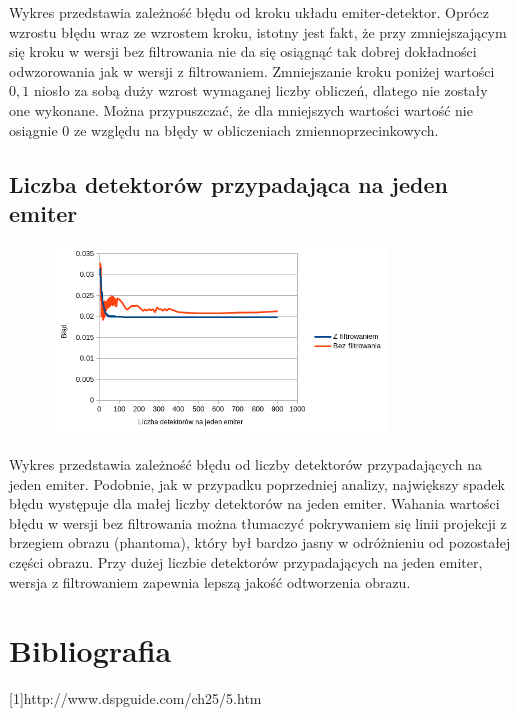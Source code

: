 \documentclass{article}
\begin{document}
Wykres przedstawia zależność błędu od kroku układu emiter-detektor. Oprócz wzrostu błędu wraz ze wzrostem kroku, istotny jest fakt, że przy zmniejszającym się kroku w wersji bez filtrowania nie da się osiągnąć tak dobrej dokładności odwzorowania jak w wersji z filtrowaniem. Zmniejszanie kroku poniżej wartości $0,1$ niosło za sobą duży wzrost wymaganej liczby obliczeń, dlatego nie zostały one wykonane. Można przypuszczać, że dla mniejszych wartości wartość nie osiągnie $0$ ze względu na błędy w obliczeniach zmiennoprzecinkowych. 

\subsection{Liczba detektorów przypadająca na jeden emiter}
\begin{figure}[H]
\begin{center}
\includegraphics[width=0.8\textwidth]{./detector_count.png}
\end{center}
\end{figure}

Wykres przedstawia zależność błędu od liczby detektorów przypadających na jeden emiter. Podobnie, jak w przypadku poprzedniej analizy, największy spadek błędu występuje dla małej liczby detektorów na jeden emiter. Wahania wartości błędu w wersji bez filtrowania można tłumaczyć pokrywaniem się linii projekcji z brzegiem obrazu (phantoma), który był bardzo jasny w odróżnieniu od pozostałej części obrazu. Przy dużej liczbie detektorów przypadających na jeden emiter, wersja z filtrowaniem zapewnia lepszą jakość odtworzenia obrazu.
\section{Bibliografia}
[1]{http://www.dspguide.com/ch25/5.htm}
\end{document}
